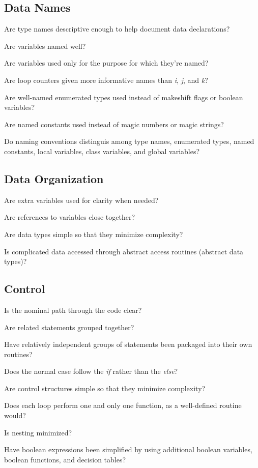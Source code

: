 \begin{multicols}{2}
\subsection*{Data Names}
\begin{todolist}
  \item Are type names descriptive enough to help document data declarations?
  \item Are variables named well?
  \item Are variables used only for the purpose for which they're named?
  \item Are loop counters given more informative names than \textit{i}, \textit{j}, and \textit{k}?
  \item Are well-named enumerated types used instead of makeshift flags or boolean variables?
  \item Are named constants used instead of magic numbers or magic strings?
  \item Do naming conventions distinguis among type names, enumerated types, named constants, local variables, class variables, and global variables?
\end{todolist}

\subsection*{Data Organization}
\begin{todolist}
  \item Are extra variables used for clarity when needed?
  \item Are references to variables close together?
  \item Are data types simple so that they minimize complexity?
  \item Is complicated data accessed through abstract access routines (abstract data types)?
\end{todolist}

\subsection*{Control}
\begin{todolist}
  \item Is the nominal path through the code clear?
  \item Are related statements grouped together?
  \item Have relatively independent groups of statements been packaged into their own routines?
  \item Does the normal case follow the \textit{if} rather than the \textit{else}?
  \item Are control structures simple so that they minimize complexity?
  \item Does each loop perform one and only one function, as a well-defined routine would?
  \item Is nesting minimized?
  \item Have boolean expressions been simplified by using additional boolean variables, boolean functions, and decision tables?
\end{todolist}


\end{multicols}
